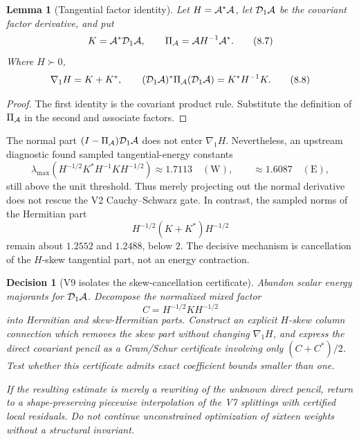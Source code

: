 \documentclass[11pt,oneside]{article}
\newtheorem{lemma}[theorem]{Lemma}
\newtheorem{decision}[theorem]{Decision}
\theoremstyle{definition}
\theoremstyle{remark}
\begin{document}
\begin{lemma}[Tangential factor identity]
\label{lem:newv8-tangent}
Let \(H={\cal A}^*{\cal A}\), let
\({\cal D}_1{\cal A}\) be the covariant factor derivative, and put
\[
 K={\cal A}^*{\cal D}_1{\cal A},\qquad
 \Pi_{\cal A}={\cal A}H^{-1}{\cal A}^*.                   \tag{8.7}
\]
Where \(H\succ0\),
\[
 \nabla_1H=K+K^*,\qquad
 ({\cal D}_1{\cal A})^*\Pi_{\cal A}
 ({\cal D}_1{\cal A})=K^*H^{-1}K.                        \tag{8.8}
\]
\end{lemma}

\begin{proof}
The first identity is the covariant product rule.  Substitute the
definition of \(\Pi_{\cal A}\) in the second and associate factors.
\end{proof}

The normal part \((I-\Pi_{\cal A}){\cal D}_1{\cal A}\) does not
enter \(\nabla_1H\).  Nevertheless, an upstream diagnostic found
sampled tangential-energy constants
\[
 \lambda_{\max}\!\left(
 H^{-1/2}K^*H^{-1}KH^{-1/2}\right)
 \approx1.7113\quad(\mathrm W),\qquad
 \approx1.6087\quad(\mathrm E),                            \tag{8.9}
\]
still above the unit threshold.  Thus merely projecting out the
normal derivative does not rescue the V2 Cauchy--Schwarz gate.
In contrast, the sampled norms of the Hermitian part
\[
 H^{-1/2}(K+K^*)H^{-1/2}                                  \tag{8.10}
\]
remain about \(1.2552\) and \(1.2488\), below \(2\).  The decisive
mechanism is cancellation of the \(H\)-skew tangential part, not an
energy contraction.

\begin{decision}[V9 isolates the skew-cancellation certificate]
\label{dec:newv8-next}
Abandon scalar energy majorants for \({\cal D}_1{\cal A}\).
Decompose the normalized mixed factor
\[
 C=H^{-1/2}KH^{-1/2}
\]
into Hermitian and skew-Hermitian parts.  Construct an explicit
\(H\)-skew column connection which removes the skew part without
changing \(\nabla_1H\), and express the direct covariant pencil as a
Gram/Schur certificate involving only
\((C+C^*)/2\).  Test whether this certificate admits exact
coefficient bounds smaller than one.

If the resulting estimate is merely a rewriting of the unknown
direct pencil, return to a shape-preserving piecewise interpolation
of the V7 splittings with certified local residuals.  Do not continue
unconstrained optimization of sixteen weights without a structural
invariant.
\end{decision}
\end{document}

